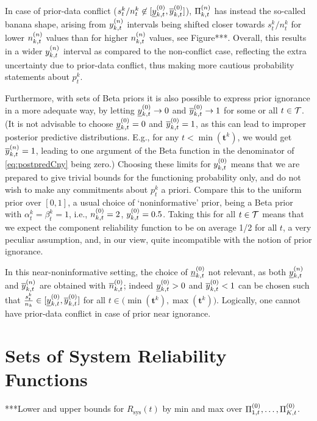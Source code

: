 \documentclass[authoryear, 12pt, a4paper]{elsarticle}
\newcommand{\bs}[1]{\boldsymbol{#1}}
\renewcommand{\vec}[1]{{\bs#1}}
\newcommand{\Rsys}{R_\text{sys}}
\newcommand{\td}[1]{%
  \iftoggle{td}{%
    \todo[inline]{#1}%
  }{}%
}
\begin{document}
In case of prior-data conflict ($s^k_t/n^k_t \not\in [\underline{y}^{(0)}_{k,t}, \overline{y}^{(0)}_{k,t}]$),
$\Pi^{(n)}_{k,t}$ has instead the so-called banana shape,
arising from $y^{(n)}_{k,t}$ intervals being shifted closer towards $s^k_t/n^k_t$
for lower $n^{(n)}_{k,t}$ values than for higher $n^{(n)}_{k,t}$ values, see Figure***.
Overall, this results in a wider $y^{(n)}_{k,t}$ interval as compared to the non-conflict case, 
reflecting the extra uncertainty due to prior-data conflict,
thus making more cautious probability statements about $p_t^k$.

Furthermore, with sets of Beta priors it is also possible
to express prior ignorance in a more adequate way,
by letting $\underline{y}^{(0)}_{k,t} \to 0$ and $\overline{y}^{(0)}_{k,t} \to 1$
for some or all $t \in {\cal T}$.
(It is not advisable to choose $\underline{y}^{(0)}_{k,t} = 0$ and $\overline{y}^{(0)}_{k,t} = 1$,
as this can lead to improper posterior predictive distributions.
E.g., for any $t < \min(\vec{t}^k)$,
we would get $\overline{y}^{(n)}_{k,t} = 1$, leading to one argument of the Beta function
in the denominator of \eqref{eq:postpredCny} being zero.)
Choosing these limits for $y^{(0)}_{k,t}$ means that we are prepared to give trivial bounds for the functioning probability only,
and do not wish to make any commitments about $p^k_t$ a priori.
Compare this to the uniform prior over $[0,1]$, a usual choice of `noninformative' prior,
being a Beta prior with $\alpha^k_t = \beta^k_t = 1$, i.e., $n^{(0)}_{k,t} = 2$, $y^{(0)}_{k,t} = 0.5$.
Taking this for all $t \in {\cal T}$ means that we expect the component reliability function
to be on average 1/2 for all $t$, a very peculiar assumption,
and, in our view, quite incompatible with the notion of prior ignorance.

In this near-noninformative setting, the choice of $\underline{n}^{(0)}_{k,t}$ not relevant,
as both $\underline{y}^{(n)}_{k,t}$ and $\overline{y}^{(n)}_{k,t}$ are obtained with $\overline{n}^{(0)}_{k,t}$;
indeed $\underline{y}^{(0)}_{k,t} > 0$ and $\overline{y}^{(0)}_{k,t} < 1$ can be chosen such that
$\frac{s^k_t}{n_k} \in [\underline{y}^{(0)}_{k,t}, \overline{y}^{(0)}_{k,t}]$ for all $t \in \big(\min(\vec{t}^k), \max(\vec{t}^k)\big)$.
Logically, one cannot have prior-data conflict in case of prior near ignorance.

\td{***called near-noninformative, for near-noninformative sets when $\yz$ is not bounded see
benavoli zaffalon papers***}


\section{Sets of System Reliability Functions}

***Lower and upper bounds for $\Rsys(t)$ by min and max over $\Pi^{(0)}_{1,t}, \ldots, \Pi^{(0)}_{K,t}$.
\end{document}
